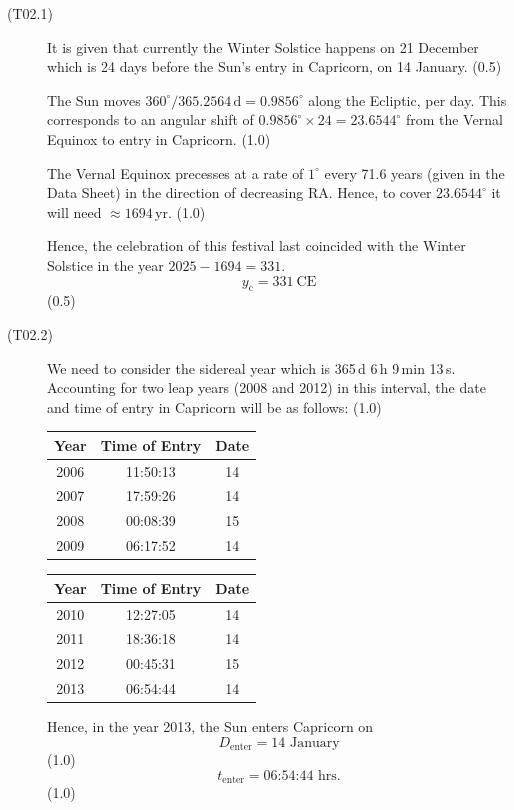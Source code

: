 \begin{description}
\item[(T02.1)] It is given that currently the Winter Solstice happens on 21
  December which is 24 days before the Sun's entry in Capricorn, on 14
  January. \hfill(0.5)

  The Sun moves $360^\circ/365.2564\,\mathrm{d} = 0.9856^\circ$ along the
  Ecliptic, per day. This corresponds to an angular shift of
  $0.9856^\circ \times 24 = 23.6544^\circ$ from the Vernal Equinox to entry in
  Capricorn. \hfill(1.0)

  The Vernal Equinox precesses at a rate of $1^\circ$ every 71.6 years (given
  in the Data Sheet) in the direction of decreasing RA. Hence, to cover
  $23.6544^\circ$ it will need ${\approx}1694$\,yr. \hfill(1.0)

  Hence, the celebration of this festival last coincided with the Winter
  Solstice in the year $2025 - 1694 = 331$.
  \[
    y_{\mathrm{c}} = 331\ \mathrm{CE}
  \]
  \hfill(0.5)

\item[(T02.2)] We need to consider the sidereal year which is
  365\,d 6\,h 9\,min 13\,s. Accounting for two leap years (2008 and 2012) in
  this interval, the date and time of entry in Capricorn will be as follows:
  \hfill(1.0)

  \begin{center}
  \begin{tabular}{|c|c|c|}
  \hline
  Year & Time of Entry & Date\\
  \hline
  2006 & 11:50:13 & 14\\
  2007 & 17:59:26 & 14\\
  2008 & 00:08:39 & 15\\
  2009 & 06:17:52 & 14\\
  \hline
  \end{tabular}
  \quad
  \begin{tabular}{|c|c|c|}
  \hline
  Year & Time of Entry & Date\\
  \hline
  2010 & 12:27:05 & 14\\
  2011 & 18:36:18 & 14\\
  2012 & 00:45:31 & 15\\
  2013 & 06:54:44 & 14\\
  \hline
  \end{tabular}
  \end{center}

  Hence, in the year 2013, the Sun enters Capricorn on
  \[
    D_{\mathrm{enter}} = \text{14 January}
  \]
  \hfill(1.0)
  \[
    t_{\mathrm{enter}} = \text{06:54:44 hrs.}
  \]
  \hfill(1.0)


\end{description}
